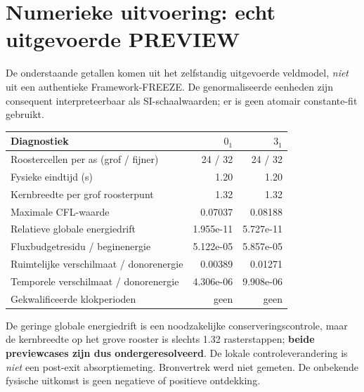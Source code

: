 \documentclass[10pt,a4paper]{article}
\begin{document}
\section{Numerieke uitvoering: echt uitgevoerde PREVIEW}
De onderstaande getallen komen uit het zelfstandig uitgevoerde veldmodel, \emph{niet} uit een authentieke Framework-FREEZE. De genormaliseerde eenheden zijn consequent interpreteerbaar als SI-schaalwaarden; er is geen atomair constante-fit gebruikt.
\begin{center}\begin{tabular}{lrr}\toprule
Diagnostiek & $0_1$ & $3_1$\\\midrule
Roostercellen per as (grof / fijner) & 24 / 32 & 24 / 32\\
Fysieke eindtijd (s) & 1.20 & 1.20\\
Kernbreedte per grof roosterpunt & 1.32 & 1.32\\
Maximale CFL-waarde & 0.07037 & 0.08188\\
Relatieve globale energiedrift & 1.955e-11 & 5.727e-11\\
Fluxbudgetresidu / beginenergie & 5.122e-05 & 5.857e-05\\
Ruimtelijke verschilmaat / donorenergie & 0.00389 & 0.01271\\
Temporele verschilmaat / donorenergie & 4.306e-06 & 9.908e-06\\
Gekwalificeerde klokperioden & geen & geen\\\bottomrule
\end{tabular}\end{center}
De geringe globale energiedrift is een noodzakelijke conserveringscontrole, maar de kernbreedte op het grove rooster is slechts 1.32 rasterstappen; \textbf{beide previewcases zijn dus ondergeresolveerd}. De lokale controleverandering is \emph{niet} een post-exit absorptiemeting. Bronvertrek werd niet gemeten. De onbekende fysische uitkomst is geen negatieve of positieve ontdekking.
\end{document}
